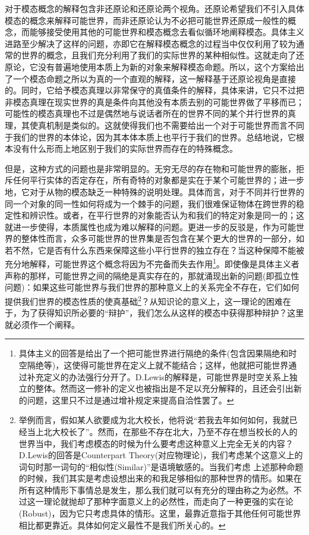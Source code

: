 \documentclass{article}
\begin{document}
对于模态概念的解释包含非还原论和还原论两个视角。还原论希望我们不引入具体模态的概念来解释可能世界，而非还原论认为不必把可能世界还原成一般性的概念，而能够接受使用其他的可能世界和模态概念去看似循环地阐释模态。具体主义进路至少解决了这样的问题，亦即它在解释模态概念的过程当中仅仅利用了较为通常的世界的概念，且我们充分利用了我们的实际世界的某种相似性。这就走向了还原论，它没有普遍地使用本质上为新的对象来解释模态命题。所以，这个方案给出了一个模态命题之所以为真的一个直观的解释，这一解释基于还原论视角是直接的。同时，它给予模态真理以非常保守的真值条件的解释，具体来讲，它只不过把非模态真理在现实世界的真是条件向其他没有本质去别的可能世界做了平移而已；可能性的模态真理也不过是偶然地与说话者所在的世界不同的某个并行世界的真理，其使真机制是类似的。这就使得我们也不需要给出一个对于可能世界而言不同于我们的世界的本体论，因为其本体本质上也平行于我们的世界。总结地说，它根本没有什么形而上地区别于我们的实际世界而存在的特殊概念。

但是，这种方式的问题也是非常明显的。无穷无尽的存在物和可能世界的膨胀，拒斥任何平行实体的否定存在，所有奇特的对象都是实在于某个可能世界的；进一步地，它对于从物的模态缺乏一种特殊的说明处理。具体而言，对于不同并行世界的同一个对象的同一性如何将成为一个棘手的问题，我们很难保证物体在跨世界的稳定性和辨识性。或者，在平行世界的对象能否认为和我们的特定对象是同一的；这就进一步使得，本质属性也成为难以解释的问题。更进一步的反驳是，作为可能世界的整体性而言，众多可能世界的世界集是否包含在某个更大的世界的一部分，如若不然，它是否有什么东西来保障这些小平行世界的独立存在？当这种保障不能被充分地解释，可能世界这个概念将因为不完备而失去作用\footnote{具体主义的回答是给出了一个把可能世界进行隔绝的条件(包含因果隔绝和时空隔绝等)，这使得可能世界在定义上就不能结合；这样，他就把可能世界通过补充定义的办法强行分开了。D.Lewis的解释是，可能世界是时空关系上独立的整体。然而这一修补的定义也被指出是不足以充分解释的，且还会引出新的问题，这里只不过是通过增补规定来提高自洽性罢了。}。即使像是具体主义者声称的那样，可能世界之间的隔绝是真实存在的，那就涌现出新的问题(即孤立性问题)：如果这些可能世界与我们世界的那种意义上的关系完全不存在，它们如何提供我们世界的模态性质的使真基础\footnote{举例而言，假如某人欲要成为北大校长，他将说“若我去年如何如何，我就已经当上北大校长了”。然而，在那些不存在北大，乃至不存在想当校长的人的世界当中，我们考虑模态的时候为什么要考虑这种意义上完全无关的内容？D.Lewis的回答是Counterpart Theory(对应物理论)，我们考虑某个这意义上的词句时那一词句的“相似性(Similar)”是语境敏感的。当我们考虑 上述那种命题的时候，我们其实是考虑设想出来的和我足够相似的那种世界的情形。如果在所有这种情形下事情总是发生，那么我们就可以有充分的理由称之为必然。不过这一理论就抛却了那种字面意义上的必然性，而走向了一种更强的实在论(Robust)，因为它只考虑具体的情形。这里，最靠近意指于其他任何可能世界相比都更靠近。具体如何定义最性不是我们所关心的。}？从知识论的意义上，这一理论的困难在于，为了获得知识所必要的“辩护”，我们怎么从这样的模态中获得那种辩护？这里就必须作一个阐释。
\end{document}
